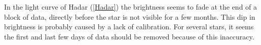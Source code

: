 \documentclass{aa}
\begin{document}
In the light curve of Hadar (\ref{Hadar}) the brightness seems to fade at the end of a block of data, directly before the star is not visible for a few months. This dip in brightness is probably caused by a lack of calibration. For several stars, it seems the first and last few days of data should be removed because of this inaccuracy.



\end{document}
